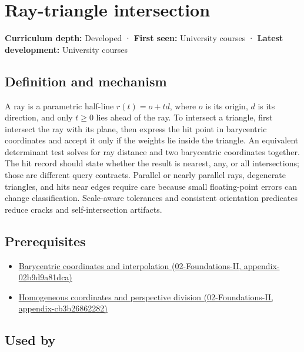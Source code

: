 \hypertarget{appendix-47ac1bd6d144}{}
\section{Ray-triangle intersection}\label{appendix-47ac1bd6d144-ray-triangle-intersection}

\textbf{Curriculum depth:} Developed · \textbf{First seen:} University courses · \textbf{Latest development:} University courses

\subsection{Definition and mechanism}\label{appendix-47ac1bd6d144-definition-and-mechanism}

A ray is a parametric half-line \(r(t)=o+td\), where \(o\) is its origin, \(d\) is its direction, and only \(t\ge0\) lies ahead of the ray. To intersect a triangle, first intersect the ray with its plane, then express the hit point in barycentric coordinates and accept it only if the weights lie inside the triangle. An equivalent determinant test solves for ray distance and two barycentric coordinates together. The hit record should state whether the result is nearest, any, or all intersections; those are different query contracts. Parallel or nearly parallel rays, degenerate triangles, and hits near edges require care because small floating-point errors can change classification. Scale-aware tolerances and consistent orientation predicates reduce cracks and self-intersection artifacts.

\subsection{Prerequisites}\label{appendix-47ac1bd6d144-prerequisites}

\begin{itemize}
\tightlist
\item
  \href{../02-Foundations-II/main.pdf\#nameddest=appendix-02b9d9a81dca}{Barycentric coordinates and interpolation (02-Foundations-II, appendix-02b9d9a81dca)}
\item
  \href{../02-Foundations-II/main.pdf\#nameddest=appendix-cb3b26862282}{Homogeneous coordinates and perspective division (02-Foundations-II, appendix-cb3b26862282)}
\end{itemize}

\subsection{Used by}\label{appendix-47ac1bd6d144-used-by}

